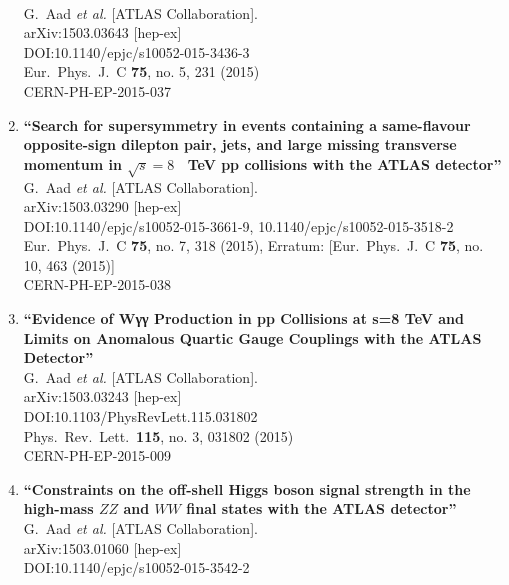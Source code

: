 \documentclass{article}
\begin{document}
\begin{enumerate}
  \\{}G.~Aad {\it et al.} [ATLAS Collaboration].
  \\{}arXiv:1503.03643 [hep-ex]
  \\{}DOI:10.1140/epjc/s10052-015-3436-3
  \\{}Eur.\ Phys.\ J.\ C {\bf 75}, no. 5, 231 (2015)
  \\{}CERN-PH-EP-2015-037
\item%
{\bf ``Search for supersymmetry in events containing a same-flavour opposite-sign dilepton pair, jets, and large missing transverse momentum in $\sqrt{s}=8$  TeV pp collisions with the ATLAS detector''}
  \\{}G.~Aad {\it et al.} [ATLAS Collaboration].
  \\{}arXiv:1503.03290 [hep-ex]
  \\{}DOI:10.1140/epjc/s10052-015-3661-9, 10.1140/epjc/s10052-015-3518-2
  \\{}Eur.\ Phys.\ J.\ C {\bf 75}, no. 7, 318 (2015), Erratum: [Eur.\ Phys.\ J.\ C {\bf 75}, no. 10, 463 (2015)]
  \\{}CERN-PH-EP-2015-038
\item%
{\bf ``Evidence of Wγγ Production in pp Collisions at s=8  TeV and Limits on Anomalous Quartic Gauge Couplings with the ATLAS Detector''}
  \\{}G.~Aad {\it et al.} [ATLAS Collaboration].
  \\{}arXiv:1503.03243 [hep-ex]
  \\{}DOI:10.1103/PhysRevLett.115.031802
  \\{}Phys.\ Rev.\ Lett.\  {\bf 115}, no. 3, 031802 (2015)
  \\{}CERN-PH-EP-2015-009
\item%
{\bf ``Constraints on the off-shell Higgs boson signal strength in the high-mass $ZZ$ and $WW$ final states with the ATLAS detector''}
  \\{}G.~Aad {\it et al.} [ATLAS Collaboration].
  \\{}arXiv:1503.01060 [hep-ex]
  \\{}DOI:10.1140/epjc/s10052-015-3542-2

\end{enumerate}
\end{document}
